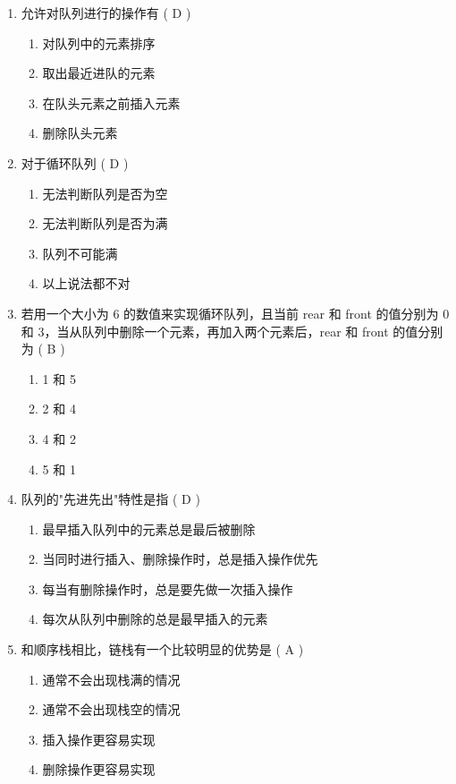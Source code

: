 \documentclass[12pt, a4paper]{article}
\begin{document}
\begin{enumerate}[label=\arabic*.]
    \item 允许对队列进行的操作有 ( D )
    \begin{enumerate}
        \item 对队列中的元素排序
        \item 取出最近进队的元素
        \item 在队头元素之前插入元素
        \item 删除队头元素
    \end{enumerate}

    \item 对于循环队列 ( D )
    \begin{enumerate}
        \item 无法判断队列是否为空
        \item 无法判断队列是否为满
        \item 队列不可能满
        \item 以上说法都不对
    \end{enumerate}

    \item 若用一个大小为 6 的数值来实现循环队列，且当前 rear 和 front 的值分别为 0 和 3，当从队列中删除一个元素，再加入两个元素后，rear 和 front 的值分别为 ( B )
    \begin{enumerate}
        \item 1 和 5
        \item 2 和 4
        \item 4 和 2
        \item 5 和 1
    \end{enumerate}

    \item 队列的"先进先出"特性是指 ( D )
    \begin{enumerate}
        \item 最早插入队列中的元素总是最后被删除
        \item 当同时进行插入、删除操作时，总是插入操作优先
        \item 每当有删除操作时，总是要先做一次插入操作
        \item 每次从队列中删除的总是最早插入的元素
    \end{enumerate}

    \item 和顺序栈相比，链栈有一个比较明显的优势是 ( A )
    \begin{enumerate}
        \item 通常不会出现栈满的情况
        \item 通常不会出现栈空的情况
        \item 插入操作更容易实现
        \item 删除操作更容易实现
    \end{enumerate}


\end{enumerate}
\end{document}
